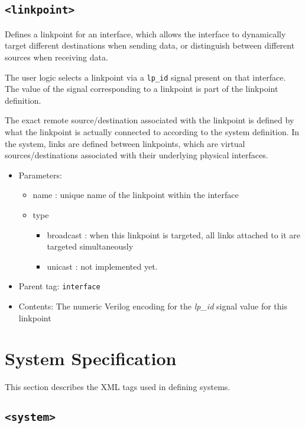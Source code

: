 \documentclass{article}
\begin{document}
\subsection{\texttt{<linkpoint>}}

Defines a linkpoint for an interface, which allows the interface to dynamically target different destinations when sending data, or distinguish between different sources when receiving data.

The user logic selects a linkpoint via a \texttt{lp\_id} signal present on that interface. The value of the signal corresponding to a linkpoint is part of the linkpoint definition.

The exact remote source/destination associated with the linkpoint is defined by what the linkpoint is actually connected to according to the system definition. In the system, links are defined between linkpoints, which are virtual sources/destinations associated with their underlying physical interfaces.

\begin{itemize}
	\item{Parameters:}
	\begin{itemize}
		\item{name : unique name of the linkpoint within the interface}
		\item{type}
		\begin{itemize}
			\item{broadcast : when this linkpoint is targeted, all links attached to it are targeted simultaneously}
			\item{unicast : not implemented yet.}
		\end{itemize}
	\end{itemize}
	\item{Parent tag: \texttt{interface}}
	\item{Contents: The numeric Verilog encoding for the \textit{lp\_id} signal value for this linkpoint}
\end{itemize}

\section{System Specification}

This section describes the XML tags used in defining systems.

\subsection{\texttt{<system>}}
\end{document}
